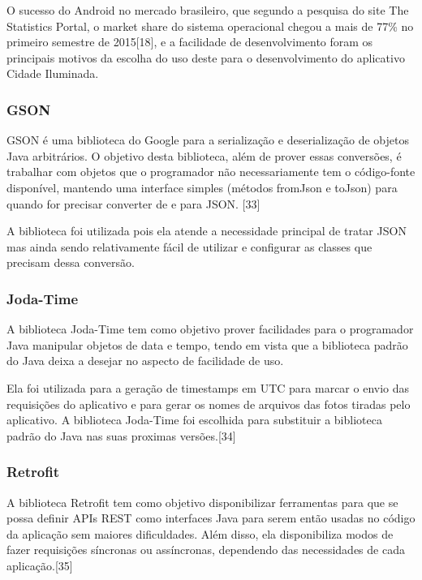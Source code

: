 \documentclass[
	article,			%
	11pt,				%
	oneside,			%
	a4paper,			%
	english,			%
	brazil,				%
	sumario=tradicional
	]{abntex2}
\begin{document}
O sucesso do Android no mercado brasileiro, que segundo a pesquisa do site The
Statistics Portal, o market share do sistema operacional chegou a mais de
77\% no primeiro semestre de 2015[18], e a facilidade de desenvolvimento foram
os principais motivos da escolha do uso deste para o desenvolvimento do
aplicativo Cidade Iluminada.

\subsubsection{GSON}

GSON é uma biblioteca do Google para a serialização e deserialização de objetos
Java arbitrários. O objetivo desta biblioteca, além de prover essas conversões,
é trabalhar com objetos que o programador não necessariamente tem o código-fonte
disponível, mantendo uma interface simples (métodos fromJson e toJson) para
quando for precisar converter de e para JSON. [33]

A biblioteca foi utilizada pois ela atende a necessidade principal de tratar
JSON mas ainda sendo relativamente fácil de utilizar e configurar as classes
que precisam dessa conversão.

\subsubsection{Joda-Time}

A biblioteca Joda-Time tem como objetivo prover facilidades para o programador Java
manipular objetos de data e tempo, tendo em vista que a biblioteca padrão do Java
deixa a desejar no aspecto de facilidade de uso.

Ela foi utilizada para a geração de timestamps em UTC para marcar o envio das
requisições do aplicativo e para gerar os nomes de arquivos das fotos tiradas
pelo aplicativo. A biblioteca Joda-Time foi escolhida para substituir a
biblioteca padrão do Java nas suas proximas versões.[34]

\subsubsection{Retrofit}

A biblioteca Retrofit tem como objetivo disponibilizar ferramentas para que se
possa definir APIs REST como interfaces Java para serem então usadas no código
da aplicação sem maiores dificuldades. Além disso, ela disponibiliza modos de
fazer requisições síncronas ou assíncronas, dependendo das necessidades de cada
aplicação.[35]
\end{document}
